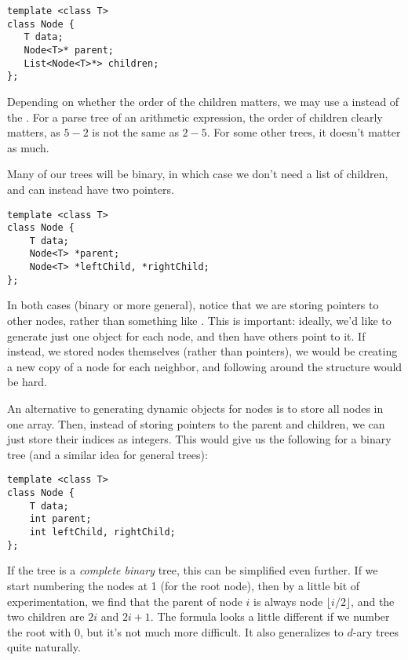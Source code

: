 \begin{verbatim}
template <class T>
class Node {
   T data;
   Node<T>* parent;
   List<Node<T>*> children;   
};
\end{verbatim}

Depending on whether the order of the children matters, we may use a 
 instead of the .
For a parse tree of an arithmetic expression, the order of children
clearly matters, as $5-2$ is not the same as $2-5$. 
For some other trees, it doesn't matter as much.

Many of our trees will be binary, in which case we don't need a list
of children, and can instead have two pointers.

\begin{verbatim}
template <class T>
class Node {
    T data;
    Node<T> *parent;
    Node<T> *leftChild, *rightChild;
};
\end{verbatim}

In both cases (binary or more general), notice that we are storing
pointers to other nodes, rather than something like
. This is important: ideally, we'd like to
generate just one object for each node, and then have others point to
it. If instead, we stored nodes themselves (rather than pointers), we
would be creating a new copy of a node for each neighbor, and
following around the structure would be hard.

\smallskip

An alternative to generating dynamic objects for nodes is to store all
nodes in one array. Then, instead of storing pointers to the parent
and children, we can just store their indices as integers.
This would give us the following for a binary tree (and a similar idea
for general trees):

\begin{verbatim}
template <class T>
class Node {
    T data;
    int parent;
    int leftChild, rightChild;
};
\end{verbatim}

If the tree is a \emph{complete binary} tree, this can be simplified
even further. If we start numbering the nodes at 1 (for the root node), 
then by a little bit of experimentation, we find that the parent of
node $i$ is always node $\lfloor i/2 \rfloor$, 
and the two children are $2i$ and $2i+1$.
The formula looks a little different if we number the root with 0, but
it's not much more difficult.
It also generalizes to $d$-ary trees quite naturally.

